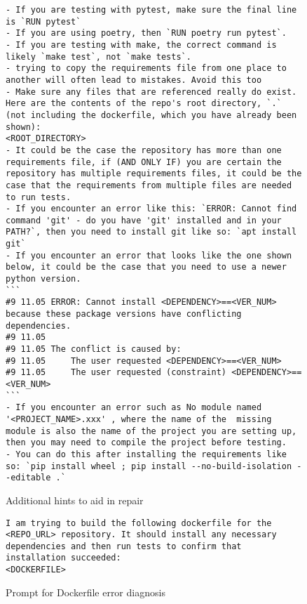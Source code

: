 \documentclass[conference]{IEEEtran}
\begin{document}
\begin{figure}[h!]
    \begin{lstlisting}
- If you are testing with pytest, make sure the final line is `RUN pytest`
- If you are using poetry, then `RUN poetry run pytest`.
- If you are testing with make, the correct command is likely `make test`, not `make tests`.
- trying to copy the requirements file from one place to another will often lead to mistakes. Avoid this too
- Make sure any files that are referenced really do exist. Here are the contents of the repo's root directory, `.` (not including the dockerfile, which you have already been shown):
<ROOT_DIRECTORY>
- It could be the case the repository has more than one requirements file, if (AND ONLY IF) you are certain the repository has multiple requirements files, it could be the case that the requirements from multiple files are needed to run tests.
- If you encounter an error like this: `ERROR: Cannot find command 'git' - do you have 'git' installed and in your PATH?`, then you need to install git like so: `apt install git`
- If you encounter an error that looks like the one shown below, it could be the case that you need to use a newer python version.
```
#9 11.05 ERROR: Cannot install <DEPENDENCY>==<VER_NUM> because these package versions have conflicting dependencies.
#9 11.05 
#9 11.05 The conflict is caused by:
#9 11.05     The user requested <DEPENDENCY>==<VER_NUM>
#9 11.05     The user requested (constraint) <DEPENDENCY>==<VER_NUM>
```
- If you encounter an error such as No module named '<PROJECT_NAME>.xxx' , where the name of the  missing module is also the name of the project you are setting up, then you may need to compile the project before testing.
- You can do this after installing the requirements like so: `pip install wheel ; pip install --no-build-isolation --editable .`
    \end{lstlisting}
    \caption{Additional hints to aid in repair}
\end{figure}

\begin{figure}[h!]
    \begin{lstlisting}
I am trying to build the following dockerfile for the <REPO_URL> repository. It should install any necessary dependencies and then run tests to confirm that installation succeeded:
<DOCKERFILE>
    \end{lstlisting}
    \caption{Prompt for Dockerfile error diagnosis}
\end{figure}
\end{document}
